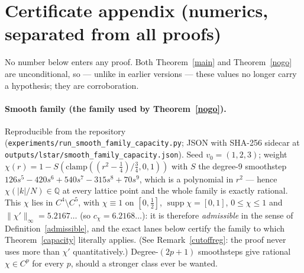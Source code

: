 \documentclass[11pt]{article}
\theoremstyle{definition}
\newcommand{\Q}{\mathbb Q}
\begin{document}
\appendix
\section{Certificate appendix (numerics, separated from all proofs)}
\label{app:certificates}

No number below enters any proof. Both Theorem~\ref{main} and
Theorem~\ref{nogo} are unconditional, so --- unlike in earlier versions
--- these values no longer carry a hypothesis; they are corroboration.

\paragraph{Smooth family (the family used by Theorem~\ref{nogo}).}
Reproducible from the repository
(\texttt{experiments/run\_smooth\_family\_capacity.py}; JSON with
SHA-256 sidecar at
\texttt{outputs/lstar/smooth\_family\_capacity.json}). Seed
$v_0=(1,2,3)$; weight
$\chi(r)=1-S(\mathrm{clamp}((r^2-\tfrac14)/\tfrac34,0,1))$ with $S$ the
degree-9 smoothstep $126s^5-420s^6+540s^7-315s^8+70s^9$, which is a
polynomial in $r^2$ --- hence $\chi(|k|/N)\in\Q$ at every lattice point
and the whole family is exactly rational. This $\chi$ lies in
$C^4\setminus C^5$, with $\chi\equiv1$ on $[0,\tfrac12]$,
$\operatorname{supp}\chi=[0,1]$, $0\le\chi\le1$ and
$\|\chi'\|_\infty=5.2167\ldots$ (so $c_\chi=6.2168\ldots$): it is
therefore \emph{admissible} in the sense of
Definition~\ref{admissible}, and the exact lanes below certify the
family to which Theorem~\ref{capacity} literally applies. (See
Remark~\ref{cutoffreg}: the proof never uses more than $\chi'$
quantitatively.) Degree-$(2p+1)$ smoothsteps give rational
$\chi\in C^p$ for every $p$, should a stronger class ever be wanted.
\end{document}
